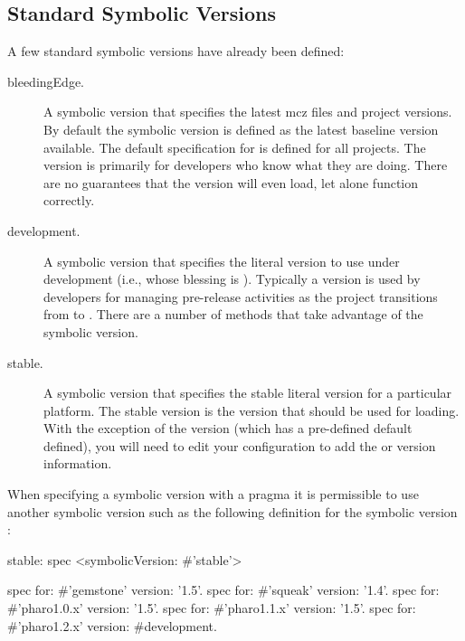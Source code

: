 \documentclass[a4paper,10pt,twoside]{book}
\begin{document}
\subsection{Standard Symbolic Versions}

A few standard symbolic versions have already been defined:

\begin{description}
\item [bleedingEdge.]  A symbolic version that specifies the latest mcz files and project versions. By default the  symbolic version is defined as the latest baseline version available. The default specification for  is defined for all projects. The  version is primarily for developers who know what they are doing. There are no guarantees that the  version will even load, let alone function correctly.

\item [development.] A symbolic version that specifies the literal version to use under development (i.e., whose blessing is ). Typically a  version is used by developers for managing pre-release activities as the project transitions from  to . There are a number of  methods that take advantage of the  symbolic version.

\item [stable.] A symbolic version that specifies the stable literal version for a particular platform. The stable version is the version that should be used for loading.
With the exception of the  version (which has a pre-defined default defined), you will need to edit your configuration to add the  or  version information.
\end{description}



When specifying a symbolic version with a  pragma it is permissible to use another symbolic version such as the following definition for the symbolic version :

\begin{code}{}
stable: spec
	<symbolicVersion: #'stable'>

	spec for: #'gemstone' version: '1.5'.
	spec for: #'squeak' version: '1.4'.
	spec for: #'pharo1.0.x' version: '1.5'.
	spec for: #'pharo1.1.x' version: '1.5'.
	spec for: #'pharo1.2.x' version: #development.
\end{code}
\end{document}
